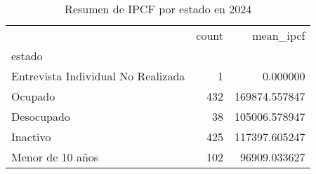 \begin{table}
\caption{Resumen de IPCF por estado en 2024}
\label{tab:ipcf_estado_2004}
\begin{tabular}{lrr}
\toprule
 & count & mean_ipcf \\
estado &  &  \\
\midrule
Entrevista Individual No Realizada & 1 & 0.000000 \\
Ocupado & 432 & 169874.557847 \\
Desocupado & 38 & 105006.578947 \\
Inactivo & 425 & 117397.605247 \\
Menor de 10 años & 102 & 96909.033627 \\
\bottomrule
\end{tabular}
\end{table}

